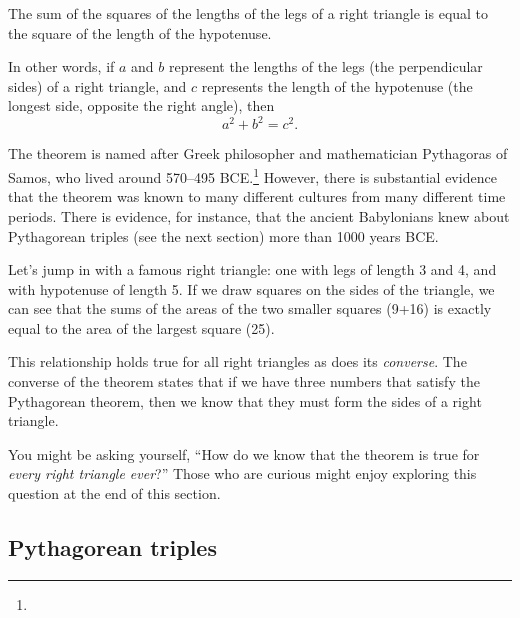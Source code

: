 \begin{boxdef}
The sum of the squares of the lengths of the \glspl{leg} of a right triangle is equal to the square of the length of the \gls{hypotenuse}.

In other words, if $a$ and $b$ represent the lengths of the legs (the perpendicular sides) of a right triangle, and $c$ represents the length of the hypotenuse (the longest side, opposite the right angle), then \[a^2 + b^2 = c^2.\]
\end{boxdef}

The theorem is named after Greek philosopher and mathematician Pythagoras of Samos, who lived around 570--495 BCE.\footnote{} However, there is substantial evidence that the theorem was known to many different cultures from many different time periods. There is evidence, for instance, that the ancient Babylonians knew about Pythagorean triples (see the next section) more than 1000 years BCE.

Let's jump in with a famous right triangle: one with legs of length 3 and 4, and with hypotenuse of length 5. If we draw squares on the sides of the triangle, we can see that the sums of the areas of the two smaller squares (9+16) is exactly equal to the area of the largest square (25).
\begin{center}
\end{center}

This relationship holds true for all right triangles as does its \textit{converse}. The converse of the theorem states that if we have three numbers that satisfy the Pythagorean theorem, then we know that they must form the sides of a right triangle.

You might be asking yourself, ``How do we know that the theorem is true for \textit{every right triangle ever}?'' Those who are curious might enjoy exploring this question at the end of this section.

\subsection{{P}ythagorean triples}

